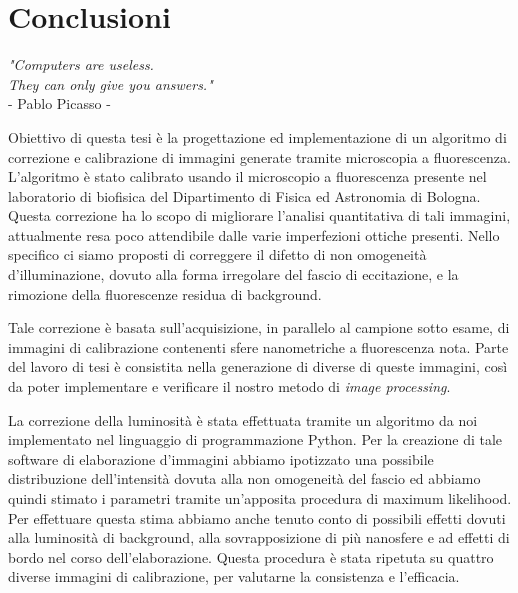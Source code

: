\clearpage{\pagestyle{empty}\cleardoublepage}

\chapter*{Conclusioni}

\begin{flushright}
\begin{small}\textit{"Computers are useless.\\
 They can only give you answers."}\\
- Pablo Picasso -\\
\end{small}\end{flushright}


Obiettivo di questa tesi è la progettazione ed implementazione di un algoritmo di correzione e calibrazione di immagini generate tramite microscopia a fluorescenza.
L'algoritmo è stato calibrato usando il microscopio a fluorescenza presente nel laboratorio di biofisica del Dipartimento di Fisica ed Astronomia di Bologna.
Questa correzione ha lo scopo di migliorare l'analisi quantitativa di tali immagini, attualmente resa poco attendibile dalle varie imperfezioni ottiche presenti.
Nello specifico ci siamo proposti di correggere il difetto di non omogeneità d'illuminazione, dovuto alla forma irregolare del fascio di eccitazione, e la rimozione della fluorescenze residua di background.

Tale correzione è basata sull'acquisizione, in parallelo al campione sotto esame, di immagini di calibrazione contenenti sfere nanometriche a fluorescenza nota.
Parte del lavoro di tesi è consistita nella generazione di diverse di queste immagini, così da poter implementare e verificare il nostro metodo di \textit{image processing}.

La correzione della luminosità è stata effettuata tramite un algoritmo da noi implementato nel linguaggio di programmazione Python.
Per la creazione di tale software di elaborazione d'immagini abbiamo ipotizzato una possibile distribuzione dell'intensità dovuta alla non omogeneità del fascio ed abbiamo quindi stimato i parametri tramite un'apposita procedura di maximum likelihood.
Per effettuare questa stima abbiamo anche tenuto conto di possibili effetti dovuti alla luminosità di background, alla sovrapposizione di più nanosfere e ad effetti di bordo nel corso dell'elaborazione.
Questa procedura è stata ripetuta su quattro diverse immagini di calibrazione, per valutarne la consistenza e l'efficacia.

